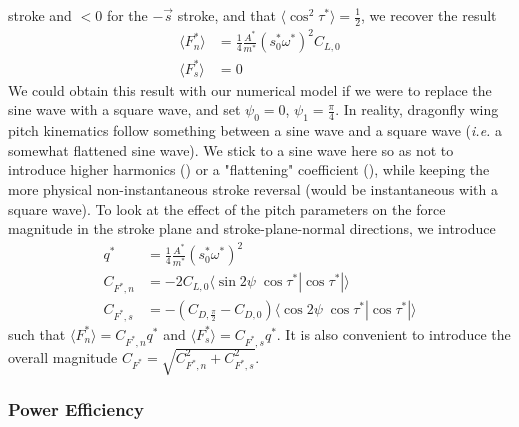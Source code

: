 \documentclass[11pt,letterpaper]{article}
\begin{document}
stroke and $< 0$ for the $-\vec{s}$ stroke, and that
$\langle \cos^2\tau^* \rangle = \frac12$, we recover the result
\begin{align}
    \langle F_n^* \rangle &= \frac14 \frac{A^*}{m^*} \left( s_0^* \omega^* \right)^2 C_{L,0} \\
    \langle F_s^* \rangle &= 0 
\end{align}
We could obtain this result with our numerical
model if we were to replace the sine wave with a
square wave, and set $\psi_0 = 0$, $\psi_1 = \frac{\pi}{4}$.
In reality, dragonfly wing pitch kinematics follow
something between a sine wave and a square wave (\emph{i.e.}
a somewhat flattened sine wave). We stick to a sine wave
here so as not to introduce higher harmonics (\cite{azuma1985}) or a "flattening"
coefficient (\cite{berman2007}), while keeping the more physical non-instantaneous
stroke reversal (would be instantaneous with a square wave).
To look at the effect of the pitch parameters on
the force magnitude in the stroke plane and stroke-plane-normal
directions, we introduce
\begin{align}
    q^* &= \frac14 \frac{A^*}{m^*} \left( s_0^* \omega^* \right)^2 \\
    C_{F^*,n} &= -2 C_{L,0} \langle \sin 2\psi\; \cos \tau^* |\cos \tau^*| \rangle \label{eq:cfn} \\
    C_{F^*,s} &= -\left(C_{D,\frac\pi2} - C_{D,0}\right) \langle \cos 2\psi\; \cos \tau^* |\cos \tau^*| \rangle \label{eq:cfs}
\end{align}
such that $\langle F_n^* \rangle = C_{F^*,n} q^*$
and $\langle F_s^* \rangle = C_{F^*,s} q^*$.
It is also convenient to introduce the overall magnitude
$C_{F^*} = \sqrt{C_{F^*,n}^2 + C_{F^*,s}^2}$.

\subsubsection{Power Efficiency}\label{sec:hover-power}
\end{document}

